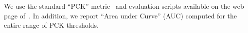  We use the standard 
``PCK''
metric~\cite{sapp13cvpr,Toshev:2014:DHP,tompson14nips} and
evaluation scripts available on the web page of~\cite{andriluka14cvpr}.
In addition, %
we report ``Area under
Curve'' (AUC) computed for the entire range of PCK thresholds.

